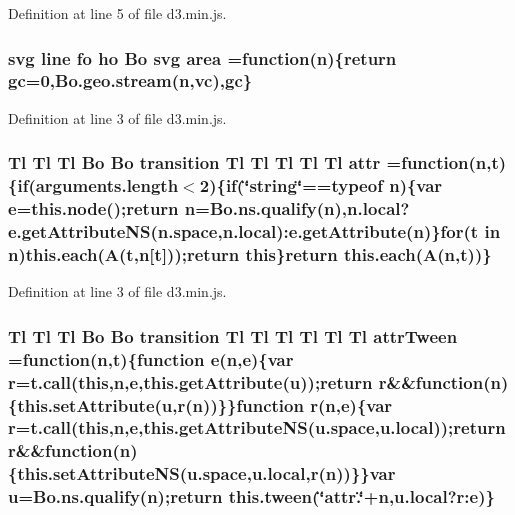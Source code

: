 Definition at line 5 of file d3.\+min.\+js.

\subsubsection[{area}]{ {\bf svg} {\bf line} {\bf fo} {\bf ho} {\bf Bo} {\bf svg} area =function({\bf n})\{{\bf return} {\bf gc}=0,{\bf Bo.\+geo.\+stream}({\bf n},{\bf vc}),{\bf gc}\}}\label{d3_8min_8js_a625070846660942fd3891a1991843844}


Definition at line 3 of file d3.\+min.\+js.

\subsubsection[{attr}]{ {\bf Tl} {\bf Tl} {\bf Tl} {\bf Bo} {\bf Bo} {\bf transition} {\bf Tl} {\bf Tl} {\bf Tl} {\bf Tl} {\bf Tl} attr =function({\bf n},t)\{{\bf if}(arguments.\+length$<$2)\{{\bf if}(\char`\"{}string\char`\"{}==typeof {\bf n})\{var {\bf e}={\bf this.\+node}();{\bf return} {\bf n}=Bo.\+ns.\+qualify({\bf n}),n.\+local?e.\+get\+Attribute\+N\+S(n.\+space,n.\+local)\+:e.\+get\+Attribute({\bf n})\}{\bf for}(t in {\bf n}){\bf this.\+each}({\bf A}(t,{\bf n}[t]));{\bf return} {\bf this}\}{\bf return} {\bf this.\+each}({\bf A}({\bf n},t))\}}\label{d3_8min_8js_ac5a3a3ba45015d7376827d835e7f142a}


Definition at line 3 of file d3.\+min.\+js.

\subsubsection[{attr\+Tween}]{ {\bf Tl} {\bf Tl} {\bf Tl} {\bf Bo} {\bf Bo} {\bf transition} {\bf Tl} {\bf Tl} {\bf Tl} {\bf Tl} {\bf Tl} {\bf Tl} attr\+Tween =function({\bf n},t)\{function {\bf e}({\bf n},{\bf e})\{var {\bf r}={\bf t.\+call}({\bf this},{\bf n},{\bf e},this.\+get\+Attribute(u));{\bf return} {\bf r}\&\&function({\bf n})\{this.\+set\+Attribute(u,{\bf r}({\bf n}))\}\}function {\bf r}({\bf n},{\bf e})\{var {\bf r}={\bf t.\+call}({\bf this},{\bf n},{\bf e},this.\+get\+Attribute\+N\+S(u.\+space,u.\+local));{\bf return} {\bf r}\&\&function({\bf n})\{this.\+set\+Attribute\+N\+S(u.\+space,u.\+local,{\bf r}({\bf n}))\}\}var u=Bo.\+ns.\+qualify({\bf n});{\bf return} {\bf this.\+tween}(\char`\"{}attr.\char`\"{}+n,u.\+local?r\+:e)\}}\label{d3_8min_8js_ade5004cdd9d64d6c9e74069096b5015e}


